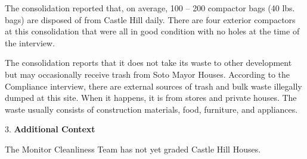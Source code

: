 The consolidation reported that, on average, 100 -- 200 compactor bags (40 lbs. bags)  are disposed of from Castle Hill daily. There are four exterior compactors at this consolidation that were all in good condition with no holes at the time of the interview.  

The consolidation reports that it does not take its waste to other development but may occasionally receive trash from Soto Mayor Houses. According to the Compliance interview, there are external sources of trash and bulk waste illegally dumped at this site. When it happens, it is from stores and private houses. The waste usually consists of construction materials, food, furniture, and appliances. 

3. \textbf{Additional Context} 

The Monitor Cleanliness Team has not yet graded Castle Hill Houses. 